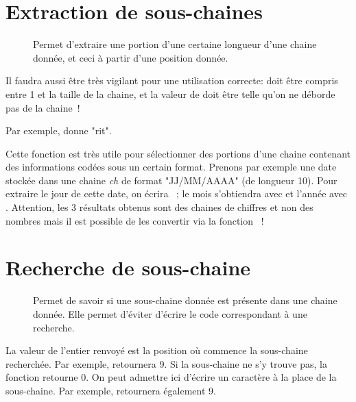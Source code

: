 \section{Extraction de sous-chaines}

	\begin{description}
	\item[]
		Permet d’extraire une portion 
		d’une certaine longueur d’une chaine donnée, 
		et ceci à partir d’une position donnée. 
	\end{description}

	Il faudra aussi être très vigilant 
	pour une utilisation correcte: 
	 doit être compris entre 1 et la taille de la chaine, 
	et la valeur de  doit être telle 
	qu’on ne déborde pas de la chaine~! 

	Par exemple,  
	donne "rit".

	Cette fonction est très utile pour sélectionner 
	des portions d’une chaine 
	contenant des informations codées sous un certain format. 
	Prenons par exemple une date stockée dans une chaine \textit{ch} de format 
	"JJ/MM/AAAA" (de longueur 10). 
	Pour extraire le jour de cette date, 
	on écrira ~; 
	le mois s’obtiendra avec  
	et l’année avec . 
	Attention, les 3 résultats obtenus sont des chaines de chiffres 
	et non des nombres mais il est possible de les convertir
	via la fonction ~!

\section{Recherche de sous-chaine}
	
	\begin{description}
	\item[]	
		Permet de savoir 
		si une sous-chaine donnée 
		est présente dans une chaine donnée. 
		Elle permet d’éviter d’écrire 
		le code correspondant à une recherche. 
	\end{description}
	
	La valeur de l’entier renvoyé est la position 
	où commence la sous-chaine recherchée. 
	Par exemple, 
	 retournera 9. 
	Si la sous-chaine ne s’y trouve pas, 
	la fonction retourne 0. 
	On peut admettre ici d’écrire un caractère à la place de la sous-chaine. 
	Par exemple, 
	 retournera également 9. 

